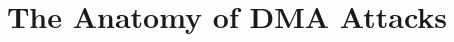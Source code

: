\documentclass[sigplan,review,anonymous]{acmart}
\begin{document}



\title{\Large \bf The Anatomy of DMA Attacks}

\end{document}
